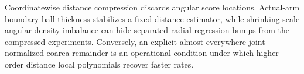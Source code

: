 Coordinatewise distance compression discards angular score locations.  Actual-arm boundary-ball thickness stabilizes a fixed distance estimator, while shrinking-scale angular density imbalance can hide separated radial regression bumps from the compressed experiments.  Conversely, an explicit almost-everywhere joint normalized-coarea remainder is an operational condition under which higher-order distance local polynomials recover faster rates.
